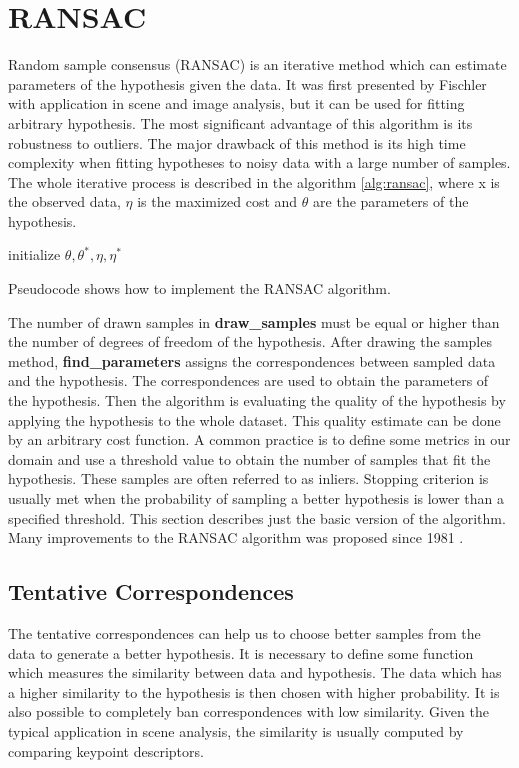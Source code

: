 \section{RANSAC}
Random sample consensus (RANSAC) is an iterative method which can estimate parameters of the hypothesis given the data. It was first presented by Fischler \cite{fischler1981} with application in scene and image analysis, but it can be used for fitting arbitrary hypothesis. The most significant advantage of this algorithm is its robustness to outliers. The major drawback of this method is its high time complexity when fitting hypotheses to noisy data with a large number of samples. The whole iterative process is described in the algorithm \ref{alg:ransac}, where x is the observed data, $\eta$ is the maximized cost and $\theta$ are the parameters of the hypothesis.
\begin{algorithm}[]
 initialize $\theta, \theta^*, \eta, \eta^*$\;
 \caption{Pseudocode shows how to implement the RANSAC algorithm.}
 \label{alg:ransac}
\end{algorithm}

The number of drawn samples in \textbf{draw\_samples} must be equal or higher than the number of degrees of freedom of the hypothesis. After drawing the samples method, \textbf{find\_parameters} assigns the correspondences between sampled data and the hypothesis. The correspondences are used to obtain the parameters of the hypothesis. Then the algorithm is evaluating the quality of the hypothesis by applying the hypothesis to the whole dataset. This quality estimate can be done by an arbitrary cost function. A common practice is to define some metrics in our domain and use a threshold value to obtain the number of samples that fit the hypothesis. These samples are often referred to as inliers. Stopping criterion is usually met when the probability of sampling a better hypothesis is lower than a specified threshold. This section describes just the basic version of the algorithm. Many improvements to the RANSAC algorithm was proposed since 1981 \cite{chum2008}.

\subsection{Tentative Correspondences}
The tentative correspondences can help us to choose better samples from the data to generate a better hypothesis. It is necessary to define some function which measures the similarity between data and hypothesis. The data which has a higher similarity to the hypothesis is then chosen with higher probability. It is also possible to completely ban correspondences with low similarity. Given the typical application in scene analysis, the similarity is usually computed by comparing keypoint descriptors.


